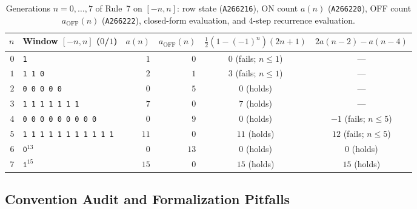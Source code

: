 \documentclass[11pt]{article}
\theoremstyle{definition}
\newcommand{\seq}[1]{\texttt{#1}}
\begin{document}
\begin{table}[ht]
\centering
\caption{Generations $n = 0, \dots, 7$ of Rule~7 on $[-n, n]$: row state (\seq{A266216}), ON count $a(n)$ (\seq{A266220}), OFF count $a_{\mathrm{OFF}}(n)$ (\seq{A266222}), closed-form evaluation, and $4$-step recurrence evaluation.}
\label{tab:small-n}
\smallskip
{\small
\begin{tabular}{@{}r l r r c c@{}}
\toprule
$n$ & Window $[-n, n]$ ($0$/$1$) & $a(n)$ & $a_{\mathrm{OFF}}(n)$ & $\frac{1}{2}(1-(-1)^n)(2n+1)$ & $2a(n-2)-a(n-4)$ \\
\midrule
$0$ & \texttt{1} & $1$ & $0$ & $0$ (fails; $n \le 1$) & --- \\
$1$ & \texttt{1 1 0} & $2$ & $1$ & $3$ (fails; $n \le 1$) & --- \\
$2$ & \texttt{0 0 0 0 0} & $0$ & $5$ & $0$ (holds) & --- \\
$3$ & \texttt{1 1 1 1 1 1 1} & $7$ & $0$ & $7$ (holds) & --- \\
$4$ & \texttt{0 0 0 0 0 0 0 0 0} & $0$ & $9$ & $0$ (holds) & $-1$ (fails; $n \le 5$) \\
$5$ & \texttt{1 1 1 1 1 1 1 1 1 1 1} & $11$ & $0$ & $11$ (holds) & $12$ (fails; $n \le 5$) \\
$6$ & $\mathtt{0}^{13}$ & $0$ & $13$ & $0$ (holds) & $0$ (holds) \\
$7$ & $\mathtt{1}^{15}$ & $15$ & $0$ & $15$ (holds) & $15$ (holds) \\
\bottomrule
\end{tabular}
}
\end{table}

\subsection{Convention Audit and Formalization Pitfalls}
\label{sec:conventions}
\end{document}
